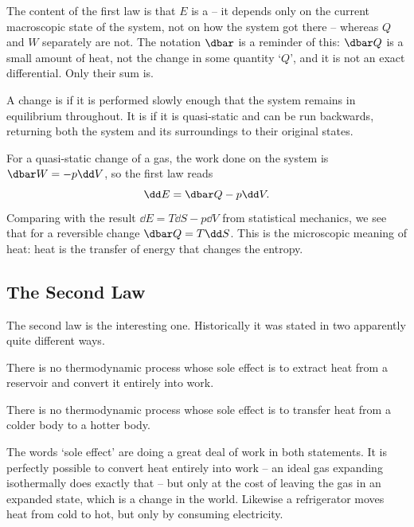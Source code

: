 The content of the first law is that $E$ is a  -- it depends only on the current macroscopic state of the system, not on how the system got there -- whereas $Q$ and $W$ separately are not. The notation $\dbar$ is a reminder of this: $\dbar Q$ is a small amount of heat, not the change in some quantity `$Q$', and it is not an exact differential. Only their sum is.

\begin{definition}
	A change is  if it is performed slowly enough that the system remains in equilibrium throughout. It is  if it is quasi-static and can be run backwards, returning both the system and its surroundings to their original states.
\end{definition}

For a quasi-static change of a gas, the work done on the system is $\dbar W = -p\dd V$, so the first law reads
$$
\dd E = \dbar Q - p\dd V.
$$
Comparing with the result $\dd E = T\dd S - p\dd V$ from statistical mechanics, we see that for a reversible change $\dbar Q = T\dd S$. This is the microscopic meaning of heat: heat is the transfer of energy that changes the entropy.

\subsection{The Second Law}

The second law is the interesting one. Historically it was stated in two apparently quite different ways.

\begin{law}
	There is no thermodynamic process whose sole effect is to extract heat from a reservoir and convert it entirely into work.
\end{law}

\begin{law}
	There is no thermodynamic process whose sole effect is to transfer heat from a colder body to a hotter body.
\end{law}

The words `sole effect' are doing a great deal of work in both statements. It is perfectly possible to convert heat entirely into work -- an ideal gas expanding isothermally does exactly that -- but only at the cost of leaving the gas in an expanded state, which is a change in the world. Likewise a refrigerator moves heat from cold to hot, but only by consuming electricity.


